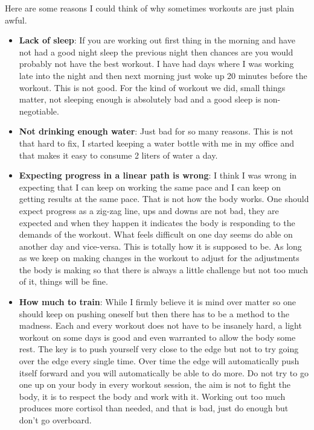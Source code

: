 \documentclass[
  oneside]{book}
\begin{document}
Here are some reasons I could think of why sometimes workouts are just plain awful.

\begin{itemize}
\item
  \textbf{Lack of sleep}: If you are working out first thing in the morning and have not had a good night sleep the previous night then chances are you would probably not have the best workout. I have had days where I was working late into the night and then next morning just woke up 20 minutes before the workout. This is not good. For the kind of workout we did, small things matter, not sleeping enough is absolutely bad and a good sleep is non-negotiable.
\item
  \textbf{Not drinking enough water}: Just bad for so many reasons. This is not that hard to fix, I started keeping a water bottle with me in my office and that makes it easy to consume 2 liters of water a day.
\item
  \textbf{Expecting progress in a linear path is wrong}: I think I was wrong in expecting that I can keep on working the same pace and I can keep on getting results at the same pace. That is not how the body works. One should expect progress as a zig-zag line, ups and downs are not bad, they are expected and when they happen it indicates the body is responding to the demands of the workout. What feels difficult on one day seems do able on another day and vice-versa. This is totally how it is supposed to be. As long as we keep on making changes in the workout to adjust for the adjustments the body is making so that there is always a little challenge but not too much of it, things will be fine.
\item
  \textbf{How much to train}: While I firmly believe it is mind over matter so one should keep on pushing oneself but then there has to be a method to the madness. Each and every workout does not have to be insanely hard, a light workout on some days is good and even warranted to allow the body some rest. The key is to push yourself very close to the edge but not to try going over the edge every single time. Over time the edge will automatically push itself forward and you will automatically be able to do more. Do not try to go one up on your body in every workout session, the aim is not to fight the body, it is to respect the body and work with it. Working out too much produces more cortisol than needed, and that is bad, just do enough but don't go overboard.
\end{itemize}
\end{document}
